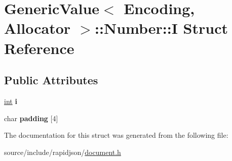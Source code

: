 \hypertarget{struct_generic_value_1_1_number_1_1_i}{}\section{Generic\+Value$<$ Encoding, Allocator $>$\+:\+:Number\+:\+:I Struct Reference}
\label{struct_generic_value_1_1_number_1_1_i}
\subsection*{Public Attributes}
\begin{DoxyCompactItemize}
\item 
\hypertarget{struct_generic_value_1_1_number_1_1_i_ae0b250dc448d284cf9019f3932bfc380}{}\hyperlink{_s_d_l__thread_8h_a6a64f9be4433e4de6e2f2f548cf3c08e}{int} {\bfseries i}\label{struct_generic_value_1_1_number_1_1_i_ae0b250dc448d284cf9019f3932bfc380}

\item 
\hypertarget{struct_generic_value_1_1_number_1_1_i_aefc064997f30c9c0b2bdce187d1d4cce}{}char {\bfseries padding} \mbox{[}4\mbox{]}\label{struct_generic_value_1_1_number_1_1_i_aefc064997f30c9c0b2bdce187d1d4cce}

\end{DoxyCompactItemize}


The documentation for this struct was generated from the following file\+:\begin{DoxyCompactItemize}
\item 
source/include/rapidjson/\hyperlink{document_8h}{document.\+h}\end{DoxyCompactItemize}
